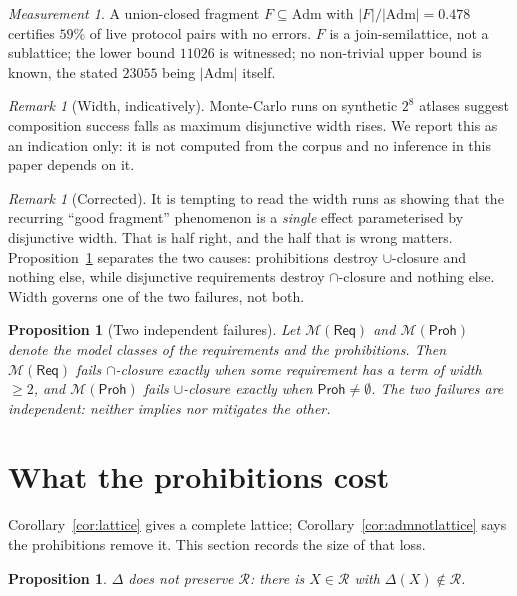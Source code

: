 \documentclass[11pt]{article}
\theoremstyle{definition}
\theoremstyle{plain}
\newtheorem{proposition}[definition]{Proposition}
\theoremstyle{remark}
\newtheorem{measurement}[definition]{Measurement}
\newtheorem{remark}[definition]{Remark}
\newcommand{\Adm}{\mathrm{Adm}}
\newcommand{\Law}{\mathsf{Req}}
\newcommand{\Haz}{\mathsf{Proh}}
\begin{document}
\begin{measurement}\label{meas:frag}
A union-closed fragment $F \subseteq \Adm$ with $|F|/|\Adm| = 0.478$ certifies
$59\%$ of live protocol pairs with no errors. $F$ is a join-semilattice, not a
sublattice; the lower bound $11026$ is witnessed; no non-trivial upper bound is known, the stated $23055$ being $|\Adm|$ itself.
\end{measurement}

\begin{remark}[Width, indicatively]
Monte-Carlo runs on synthetic $2^8$ atlases suggest composition success falls as
maximum disjunctive width rises. We report this as an indication only: it is not
computed from the corpus and no inference in this paper depends on it.
\end{remark}

\begin{remark}[Corrected]
It is tempting to read the width runs as showing that the recurring
``good fragment'' phenomenon is a \emph{single} effect parameterised by
disjunctive width. That is half right, and the half that is wrong matters.
Proposition~\ref{prop:twoeffects} separates the two causes: prohibitions destroy
$\cup$-closure and nothing else, while disjunctive requirements destroy
$\cap$-closure and nothing else. Width governs one of the two failures, not both.
\end{remark}

\begin{proposition}[Two independent failures]\label{prop:twoeffects}
Let $\mathcal{M}(\Law)$ and $\mathcal{M}(\Haz)$ denote the model classes of the
requirements and the prohibitions. Then $\mathcal{M}(\Law)$ fails
$\cap$-closure exactly when some requirement has a term of width $\ge 2$, and
$\mathcal{M}(\Haz)$ fails $\cup$-closure exactly when $\Haz \neq \emptyset$. The
two failures are independent: neither implies nor mitigates the other.
\end{proposition}

\section{What the prohibitions cost}\label{sec:cost}

Corollary~\ref{cor:lattice} gives a complete lattice; Corollary~\ref{cor:admnotlattice}
says the prohibitions remove it. This section records the size of that loss.

\begin{proposition}\label{prop:noinvariance}
$\Delta$ does not preserve $\mathcal{R}$: there is $X \in \mathcal{R}$ with
$\Delta(X) \notin \mathcal{R}$.
\end{proposition}
\end{document}
